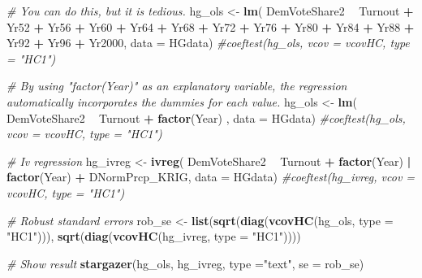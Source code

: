 \documentclass[]{book}
\newenvironment{Shaded}{\begin{snugshade}}{\end{snugshade}}
\newcommand{\KeywordTok}[1]{\textcolor[rgb]{0.13,0.29,0.53}{\textbf{#1}}}
\newcommand{\DataTypeTok}[1]{\textcolor[rgb]{0.13,0.29,0.53}{#1}}
\newcommand{\StringTok}[1]{\textcolor[rgb]{0.31,0.60,0.02}{#1}}
\newcommand{\CommentTok}[1]{\textcolor[rgb]{0.56,0.35,0.01}{\textit{#1}}}
\newcommand{\OperatorTok}[1]{\textcolor[rgb]{0.81,0.36,0.00}{\textbf{#1}}}
\newcommand{\NormalTok}[1]{#1}
\begin{document}
\begin{Shaded}
\begin{Highlighting}[]
\CommentTok{# You can do this, but it is tedious.}
\NormalTok{hg_ols <-}\StringTok{ }\KeywordTok{lm}\NormalTok{( DemVoteShare2 }\OperatorTok{~}\StringTok{ }\NormalTok{Turnout }\OperatorTok{+}\StringTok{ }\NormalTok{Yr52 }\OperatorTok{+}\StringTok{ }\NormalTok{Yr56 }\OperatorTok{+}\StringTok{ }\NormalTok{Yr60 }\OperatorTok{+}\StringTok{ }\NormalTok{Yr64 }\OperatorTok{+}\StringTok{ }\NormalTok{Yr68 }\OperatorTok{+}\StringTok{ }
\StringTok{                }\NormalTok{Yr72 }\OperatorTok{+}\StringTok{ }\NormalTok{Yr76 }\OperatorTok{+}\StringTok{ }\NormalTok{Yr80 }\OperatorTok{+}\StringTok{ }\NormalTok{Yr84 }\OperatorTok{+}\StringTok{ }\NormalTok{Yr88 }\OperatorTok{+}\StringTok{ }\NormalTok{Yr92 }\OperatorTok{+}\StringTok{ }\NormalTok{Yr96 }\OperatorTok{+}\StringTok{ }\NormalTok{Yr2000,  }\DataTypeTok{data =}\NormalTok{ HGdata)}
\CommentTok{#coeftest(hg_ols, vcov = vcovHC, type = "HC1")}

\CommentTok{# By using "factor(Year)" as an explanatory variable, the regression automatically incorporates the dummies for each value.}
\NormalTok{hg_ols <-}\StringTok{ }\KeywordTok{lm}\NormalTok{( DemVoteShare2 }\OperatorTok{~}\StringTok{ }\NormalTok{Turnout }\OperatorTok{+}\StringTok{ }\KeywordTok{factor}\NormalTok{(Year)   ,  }\DataTypeTok{data =}\NormalTok{ HGdata)}
\CommentTok{#coeftest(hg_ols, vcov = vcovHC, type = "HC1")}

\CommentTok{# Iv regression}
\NormalTok{hg_ivreg <-}\StringTok{ }\KeywordTok{ivreg}\NormalTok{( DemVoteShare2 }\OperatorTok{~}\StringTok{ }\NormalTok{Turnout }\OperatorTok{+}\StringTok{ }\KeywordTok{factor}\NormalTok{(Year) }\OperatorTok{|}\StringTok{ }
\StringTok{                    }\KeywordTok{factor}\NormalTok{(Year) }\OperatorTok{+}\StringTok{ }\NormalTok{DNormPrcp_KRIG, }\DataTypeTok{data =}\NormalTok{ HGdata)}
\CommentTok{#coeftest(hg_ivreg, vcov = vcovHC, type = "HC1")}

\CommentTok{# Robust standard errors }
\NormalTok{rob_se <-}\StringTok{ }\KeywordTok{list}\NormalTok{(}\KeywordTok{sqrt}\NormalTok{(}\KeywordTok{diag}\NormalTok{(}\KeywordTok{vcovHC}\NormalTok{(hg_ols, }\DataTypeTok{type =} \StringTok{"HC1"}\NormalTok{))),}
               \KeywordTok{sqrt}\NormalTok{(}\KeywordTok{diag}\NormalTok{(}\KeywordTok{vcovHC}\NormalTok{(hg_ivreg, }\DataTypeTok{type =} \StringTok{"HC1"}\NormalTok{))))}

\CommentTok{# Show result}
\KeywordTok{stargazer}\NormalTok{(hg_ols, hg_ivreg, }\DataTypeTok{type =}\StringTok{"text"}\NormalTok{, }\DataTypeTok{se =}\NormalTok{ rob_se)}
\end{Highlighting}
\end{Shaded}
\end{document}
